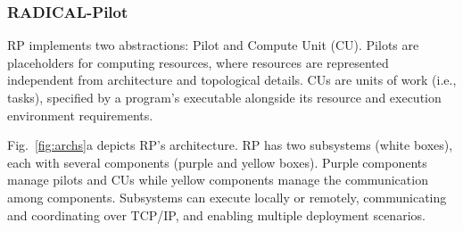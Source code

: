 \documentclass[preprint,12pt, a4paper]{elsarticle}
\begin{document}

\subsubsection{RADICAL-Pilot}\label{sssec:arch_rp}

RP implements two abstractions: Pilot and Compute Unit (CU). 
Pilots are placeholders for computing resources, where resources are
represented independent from architecture and topological details. CUs are
units of work (i.e., tasks), specified by a program's executable alongside
its resource and execution environment requirements.

Fig.~\ref{fig:archs}a depicts RP's architecture. RP has two subsystems (white
boxes), each with several components (purple and yellow boxes). 
Purple components manage pilots and CUs while yellow components manage the
communication among components. Subsystems can execute locally or remotely,
communicating and coordinating over TCP/IP, and enabling multiple deployment
scenarios.

\end{document}
